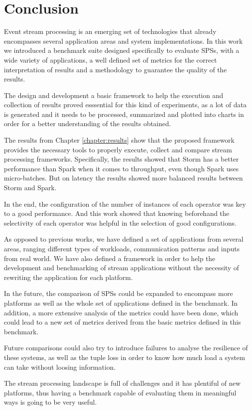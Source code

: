 \documentclass[ppgc,diss,english]{iiufrgs}
\begin{document}


\chapter{Conclusion}
\label{chapter:conclusion}

Event stream processing is an emerging set of technologies that already encompasses several application areas and system implementations. In this work we introduced a benchmark suite designed specifically to evaluate SPSs, with a wide variety of applications, a well defined set of metrics for the correct interpretation of results and a methodology to guarantee the quality of the results.

The design and development a basic framework to help the execution and collection of results proved esssential for this kind of experiments, as a lot of data is generated and it needs to be processed, summarized and plotted into charts in order for a better understanding of the results obtained.

The results from Chapter \ref{chapter:results} show that the proposed framework provides the necessary tools to properly execute, collect and compare stream processing frameworks. Specifically, the results showed that Storm has a better performance than Spark when it comes to throughput, even though Spark uses micro-batches. But on latency the results showed more balanced results between Storm and Spark.

In the end, the configuration of the number of instances of each operator was key to a good performance. And this work showed that knowing beforehand the selectivity of each operator was helpful in the selection of good configurations.

As opposed to previous works, we have defined a set of applications from several areas, ranging different types of workloads, communication patterns and inputs from real world. We have also defined a framework in order to help the development and benchmarking of stream applications without the necessity of rewriting the application for each platform.

In the future, the comparison of SPSs could be expanded to encompass more platforms as well as the whole set of applications defined in the benchmark. In addition, a more extensive analysis of the metrics could have been done, which could lead to a new set of metrics derived from the basic metrics defined in this benchmark.

Future comparisons could also try to introduce failures to analyse the resilience of these systems, as well as the tuple loss in order to know how much load a system can take without loosing information.

The stream processing landscape is full of challenges and it has plentiful of new platforms, thus having a benchmark capable of evaluating them in meaningful ways is going to be very useful.




\end{document}
